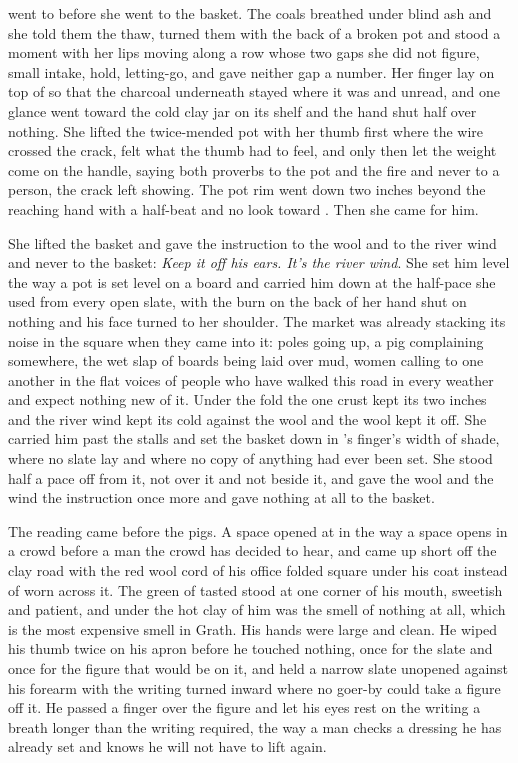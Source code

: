  went to  before she went to the basket. The coals breathed under blind ash and she told them the thaw, turned them with the back of a broken pot and stood a moment with her lips moving along a row whose two gaps she did not figure, small intake, hold, letting-go, and gave neither gap a number. Her finger lay on top of  so that the charcoal underneath stayed where it was and unread, and one glance went toward the cold clay jar on its shelf and the hand shut half over nothing. She lifted the twice-mended pot with her thumb first where the wire crossed the crack, felt what the thumb had to feel, and only then let the weight come on the handle, saying both proverbs to the pot and the fire and never to a person, the crack left showing. The pot rim went down two inches beyond the reaching hand with a half-beat and no look toward . Then she came for him.

She lifted the basket and gave the instruction to the wool and to the river wind and never to the basket: \emph{Keep it off his ears. It's the river wind}. She set him level the way a pot is set level on a board and carried him down  at the half-pace she used from every open slate, with the burn on the back of her hand shut on nothing and his face turned to her shoulder. The market was already stacking its noise in the square when they came into it: poles going up, a pig complaining somewhere, the wet slap of boards being laid over mud, women calling to one another in the flat voices of people who have walked this road in every weather and expect nothing new of it. Under the fold the one crust kept its two inches and the river wind kept its cold against the wool and the wool kept it off. She carried him past the stalls and set the basket down in 's finger's width of shade, where no slate lay and where no copy of anything had ever been set. She stood half a pace off from it, not over it and not beside it, and gave the wool and the wind the instruction once more and gave nothing at all to the basket.

\scenebreak

The reading came before the pigs. A space opened at  in the way a space opens in a crowd before a man the crowd has decided to hear, and  came up short off the clay road with the red wool cord of his office folded square under his coat instead of worn across it. The green of tasted  stood at one corner of his mouth, sweetish and patient, and under the hot clay of him was the smell of nothing at all, which is the most expensive smell in Grath. His hands were large and clean. He wiped his thumb twice on his apron before he touched nothing, once for the slate and once for the figure that would be on it, and held a narrow slate unopened against his forearm with the writing turned inward where no goer-by could take a figure off it. He passed a finger over the figure and let his eyes rest on the writing a breath longer than the writing required, the way a man checks a dressing he has already set and knows he will not have to lift again.

